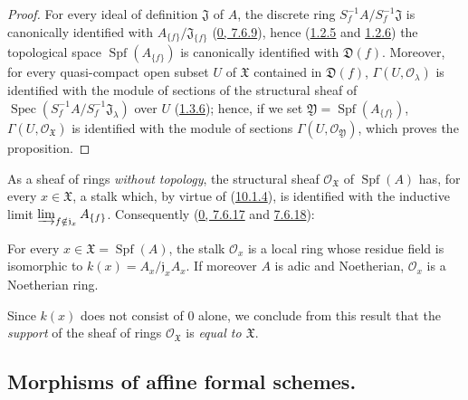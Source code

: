 \begin{proof}
For every ideal of definition $\mathfrak{J}$ of $A$, the discrete ring
$S_f^{-1}A/S_f^{-1}\mathfrak{J}$ is canonically identified with
$A_{\{f\}}/\mathfrak{J}_{\{f\}}$
(\hyperref[0.7.6.9]{0, 7.6.9}), hence
(\hyperref[I.1.2.5]{1.2.5} and \hyperref[I.1.2.6]{1.2.6}) the
topological space $\operatorname{Spf}(A_{\{f\}})$ is canonically identified
with $\mathfrak{D}(f)$. Moreover, for every quasi-compact open subset $U$
of $\mathfrak{X}$ contained in $\mathfrak{D}(f)$,
$\Gamma(U,\mathscr{O}_\lambda)$ is identified with the module of sections
of the structural sheaf of
$\operatorname{Spec}(S_f^{-1}A/S_f^{-1}\mathfrak{J}_\lambda)$ over
$U$ (\hyperref[I.1.3.6]{1.3.6}); hence, if we set
$\mathfrak{Y}=\operatorname{Spf}(A_{\{f\}})$,
$\Gamma(U,\mathscr{O}_{\mathfrak{X}})$ is identified with the module of
sections $\Gamma(U,\mathscr{O}_{\mathfrak{Y}})$, which proves the
proposition.
\end{proof}

\begin{env}[10.1.5]
\label{I.10.1.5}
As a sheaf of rings \emph{without topology}, the structural sheaf
$\mathscr{O}_{\mathfrak{X}}$ of
$\operatorname{Spf}(A)$ has, for every $x\in\mathfrak{X}$, a stalk which,
by virtue of (\hyperref[I.10.1.4]{10.1.4}), is identified with the
inductive limit
$\varinjlim_{f\notin\mathfrak{j}_x}A_{\{f\}}$. Consequently
(\hyperref[0.7.6.17]{0, 7.6.17} and
\hyperref[0.7.6.18]{7.6.18}):
\end{env}

\begin{proposition}[10.1.6]
\label{I.10.1.6}
For every $x\in\mathfrak{X}=\operatorname{Spf}(A)$, the stalk
$\mathscr{O}_x$ is a local ring whose residue field is isomorphic to
$k(x)=A_x/\mathfrak{j}_xA_x$. If moreover $A$ is adic and Noetherian,
$\mathscr{O}_x$ is a Noetherian ring.
\end{proposition}

Since $k(x)$ does not consist of 0 alone, we conclude from this result
that the \emph{support} of the sheaf of rings $\mathscr{O}_{\mathfrak{X}}$
is \emph{equal to $\mathfrak{X}$}.

\subsection{Morphisms of affine formal schemes.}
\label{subsection:I.10.2}

